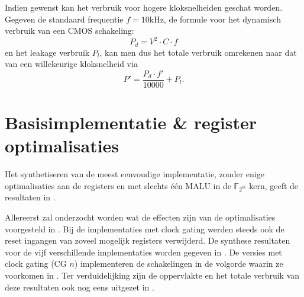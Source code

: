 
Indien gewenst kan het verbruik voor hogere kloksnelheiden geschat worden. Gegeven de standaard frequentie $f = 10$kHz, de formule voor het dynamisch verbruik van een CMOS schakeling:
\[P_d = V^2 \cdot C \cdot f\]
en het leakage verbruik $P_l$, kan men dus het totale verbruik omrekenen naar dat van een willekeurige kloksnelheid via
\[P' = \frac{P_d \cdot f'}{10 000} + P_l.\]

\section{Basisimplementatie \& register optimalisaties\label{section-resultaten-basisimplementatie}}

Het synthetiseren van de meest eenvoudige implementatie, zonder enige optimalisaties aan de registers en met slechts \'e\'en MALU in de $\mathbb{F}_{2^m}$ kern, geeft de resultaten in .


Allereerst zal onderzocht worden wat de effecten zijn van de optimalisaties voorgesteld in . Bij de implementaties met clock gating werden steeds ook de reset ingangen van zoveel mogelijk registers verwijderd. De synthese resultaten voor de vijf verschillende implementaties worden gegeven in . De versies met clock gating (CG $n$) implementeren de schakelingen in de volgorde waarin ze voorkomen in . Ter verduidelijking zijn de oppervlakte en het totale verbruik van deze resultaten ook nog eens uitgezet in .


